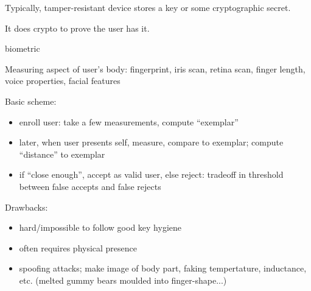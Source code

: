 Typically, tamper-resistant device stores a key or some cryptographic secret.

It does crypto to prove the user has it.
\begin{definition}{biometric}

Measuring aspect of user's body: fingerprint, iris scan, retina scan, finger
length, voice properties, facial features
\end{definition}

Basic scheme:
\begin{itemize}
    \item enroll user: take a few measurements, compute ``exemplar''
    \item later, when user presents self, measure, compare to exemplar; compute
            ``distance'' to exemplar
    \item if ``close enough'', accept as valid user, else reject: tradeoff in
    threshold between false accepts and false rejects
\end{itemize}
Drawbacks:
\begin{itemize}
    \item hard/impossible to follow good key hygiene
    \item often requires physical presence
    \item spoofing attacks; make image of body part, faking tempertature,
            inductance, etc. (melted gummy bears moulded into finger-shape...)
\end{itemize}
